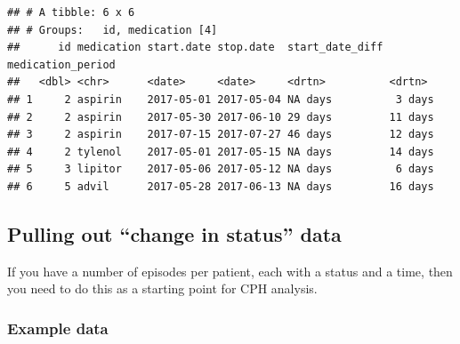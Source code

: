 \documentclass[
]{book}
\begin{document}
\begin{verbatim}
## # A tibble: 6 x 6
## # Groups:   id, medication [4]
##      id medication start.date stop.date  start_date_diff medication_period
##   <dbl> <chr>      <date>     <date>     <drtn>          <drtn>           
## 1     2 aspirin    2017-05-01 2017-05-04 NA days          3 days          
## 2     2 aspirin    2017-05-30 2017-06-10 29 days         11 days          
## 3     2 aspirin    2017-07-15 2017-07-27 46 days         12 days          
## 4     2 tylenol    2017-05-01 2017-05-15 NA days         14 days          
## 5     3 lipitor    2017-05-06 2017-05-12 NA days          6 days          
## 6     5 advil      2017-05-28 2017-06-13 NA days         16 days
\end{verbatim}

\hypertarget{pulling-out-change-in-status-data}{%
\subsection{Pulling out ``change in status'' data}\label{pulling-out-change-in-status-data}}

If you have a number of episodes per patient, each with a status and a time, then you need to do this as a starting point for CPH analysis.

\hypertarget{example-data}{%
\subsubsection{Example data}\label{example-data}}
\end{document}

